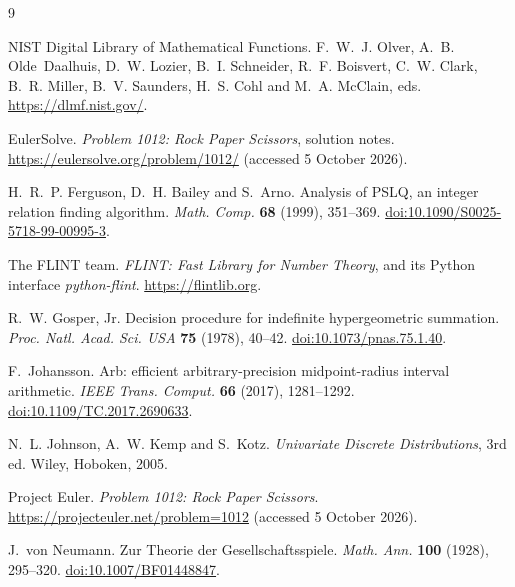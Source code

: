 \documentclass[11pt]{article}
\theoremstyle{definition}
\theoremstyle{remark}
\begin{document}
\begin{thebibliography}{9}
\small
\raggedright

NIST Digital Library of Mathematical Functions.
F.~W.~J. Olver, A.~B. Olde~Daalhuis, D.~W. Lozier, B.~I. Schneider,
R.~F. Boisvert, C.~W. Clark, B.~R. Miller, B.~V. Saunders, H.~S. Cohl
and M.~A. McClain, eds.
\url{https://dlmf.nist.gov/}.

EulerSolve.
\emph{Problem 1012: Rock Paper Scissors}, solution notes.
\url{https://eulersolve.org/problem/1012/} (accessed 5 October 2026).

H.~R.~P. Ferguson, D.~H. Bailey and S.~Arno.
Analysis of PSLQ, an integer relation finding algorithm.
\emph{Math. Comp.} \textbf{68} (1999), 351--369.
\href{https://doi.org/10.1090/S0025-5718-99-00995-3}{doi:10.1090/S0025-5718-99-00995-3}.

The FLINT team.
\emph{FLINT: Fast Library for Number Theory}, and its Python interface
\emph{python-flint}.
\url{https://flintlib.org}.

R.~W. Gosper, Jr.
Decision procedure for indefinite hypergeometric summation.
\emph{Proc. Natl. Acad. Sci. USA} \textbf{75} (1978), 40--42.
\href{https://doi.org/10.1073/pnas.75.1.40}{doi:10.1073/pnas.75.1.40}.

F.~Johansson.
Arb: efficient arbitrary-precision midpoint-radius interval arithmetic.
\emph{IEEE Trans. Comput.} \textbf{66} (2017), 1281--1292.
\href{https://doi.org/10.1109/TC.2017.2690633}{doi:10.1109/TC.2017.2690633}.

N.~L. Johnson, A.~W. Kemp and S.~Kotz.
\emph{Univariate Discrete Distributions}, 3rd ed.
Wiley, Hoboken, 2005.

Project Euler.
\emph{Problem 1012: Rock Paper Scissors}.
\url{https://projecteuler.net/problem=1012} (accessed 5 October 2026).

J.~von Neumann.
Zur Theorie der Gesellschaftsspiele.
\emph{Math. Ann.} \textbf{100} (1928), 295--320.
\href{https://doi.org/10.1007/BF01448847}{doi:10.1007/BF01448847}.

\end{thebibliography}
\end{document}
